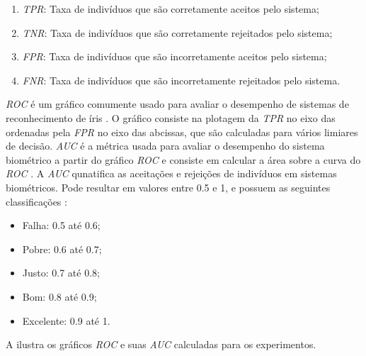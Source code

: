 \begin{enumerate}
    \item \textit{\acrfull{TPR}}: Taxa de indivíduos que são corretamente aceitos pelo sistema;
    \item \textit{\acrfull{TNR}}: Taxa de indivíduos que são corretamente rejeitados pelo sistema;
    \item \textit{\acrfull{FPR}}: Taxa de indivíduos que são incorretamente aceitos pelo sistema;
    \item \textit{\acrfull{FNR}}: Taxa de indivíduos que são incorretamente rejeitados pelo sistema.
\end{enumerate}

\par \textit{\acrshort{ROC}} é um gráfico comumente usado para avaliar o desempenho de sistemas de reconhecimento de íris \cite{aucROC, daugman2000}. O gráfico consiste na plotagem da \textit{\acrshort{TPR}} no eixo das ordenadas pela \textit{\acrshort{FPR}} no eixo das abcissas, que são calculadas para vários limiares de decisão. \textit{\acrshort{AUC}} é a métrica usada para avaliar o desempenho do sistema biométrico a partir do gráfico \textit{\acrshort{ROC}} e consiste em calcular a área sobre a curva do \textit{\acrshort{ROC}} \cite{aucROC}. A \textit{\acrshort{AUC}} qunatifica as aceitações e rejeições de indivíduos em sistemas biométricos. Pode resultar em valores entre 0.5 e 1, e possuem as seguintes classificações \cite{aucROC}:

\begin{itemize}
    \item Falha: 0.5 até 0.6;
    \item Pobre: 0.6 até 0.7;
    \item Justo: 0.7 até 0.8;
    \item Bom: 0.8 até 0.9;
    \item Excelente: 0.9 até 1.
\end{itemize}

A  ilustra os gráficos \textit{\acrshort{ROC}} e suas \textit{\acrshort{AUC}} calculadas para os experimentos.

